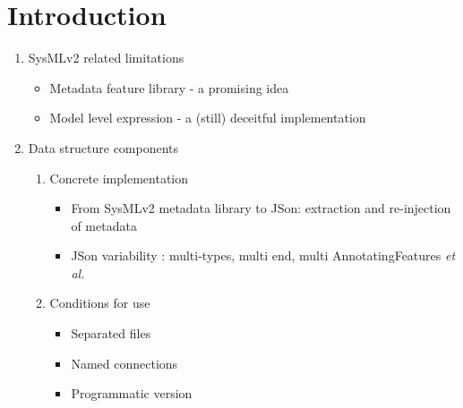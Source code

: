 
%	



\section{Introduction}\label{sect:intro}

\begin{enumerate}
    \item SysMLv2 related limitations
        \begin{itemize}
            \item Metadata feature library - a promising idea
            \item Model level expression - a (still) deceitful implementation
        \end{itemize}
    \item Data structure components
         \begin{enumerate}
            \item Concrete implementation
                \begin{itemize}
                    \item From SysMLv2 metadata library to JSon: extraction and re-injection of metadata
                    \item JSon variability : multi-types, multi end, multi AnnotatingFeatures \textit{et al.}
                \end{itemize}
            \item Conditions for use
               \begin{itemize}
                    \item Separated files
                    \item Named connections
                    \item Programmatic version
                \end{itemize}
        \end{enumerate}
   

\end{enumerate}
